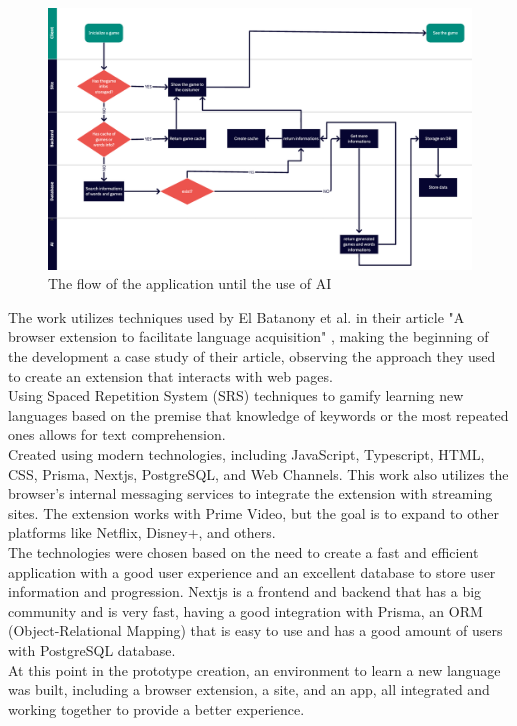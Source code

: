 \documentclass[12pt]{article}
\begin{document}
\begin{figure}[!h]
  \centering
  \caption{
    The flow of the application until the use of AI
  }
  \label{fig:flow_diagram}
  \includegraphics[width=1\textwidth]{assets/26.png}
\end{figure}
The work utilizes techniques used by El Batanony et al. in their article "A browser extension to facilitate language acquisition" \cite{ElBatanony21}, making the beginning of the development a case study of their article, observing the approach they used to create an extension that interacts with web pages.  \\
Using Spaced Repetition System (SRS) techniques to gamify learning new languages based on the premise that knowledge of keywords or the most repeated ones allows for text comprehension. \\
Created using modern technologies, including JavaScript, Typescript, HTML, CSS, Prisma, Nextjs, PostgreSQL, and Web Channels. This work also utilizes the browser's internal messaging services to integrate the extension with streaming sites. The extension works with Prime Video, but the goal is to expand to other platforms like Netflix, Disney+, and others. \\
The technologies were chosen based on the need to create a fast and efficient application with a good user experience and an excellent database to store user information and progression. Nextjs is a frontend and backend that has a big community and is very fast, having a good integration with Prisma, an ORM (Object-Relational Mapping) that is easy to use and has a good amount of users with PostgreSQL database. \\
At this point in the prototype creation, an environment to learn a new language was built, including a browser extension, a site, and an app, all integrated and working together to provide a better experience. \\
\end{document}
